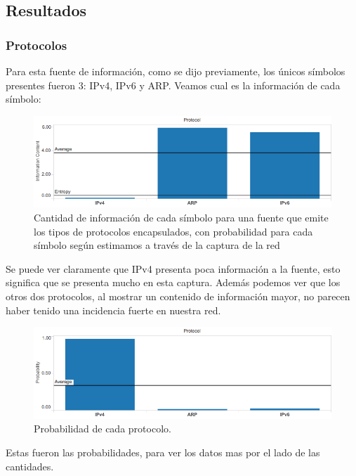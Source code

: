 \documentclass{article}
\theoremstyle{definition}
\theoremstyle{remark}
\begin{document}
\subsection{Resultados}

\subsubsection{Protocolos}

Para esta fuente de información, como se dijo previamente, los únicos símbolos presentes fueron 3: IPv4, IPv6 y ARP. Veamos cual es la información de cada símbolo:

\begin{figure}[H]
\centering
\includegraphics[width=400pt]{captures/MercadoLibre/Protocol PDF Dashboard.png}
\caption{Cantidad de información de cada símbolo para una fuente que emite los tipos de protocolos encapsulados, con probabilidad para cada símbolo según estimamos a través de la captura de la red}
\end{figure}

Se puede ver claramente que IPv4 presenta poca información a la fuente, esto significa que se presenta mucho en esta captura. Además podemos ver que los otros dos protocolos, al mostrar un contenido de información mayor, no parecen haber tenido una incidencia fuerte en nuestra red.

\begin{figure}[H]
\centering
\includegraphics[width=400pt]{captures/MercadoLibre/Protocol PDF Dashboard probability.png}
\caption{Probabilidad de cada protocolo.}
\end{figure}

Estas fueron las probabilidades, para ver los datos mas por el lado de las cantidades.
\end{document}
